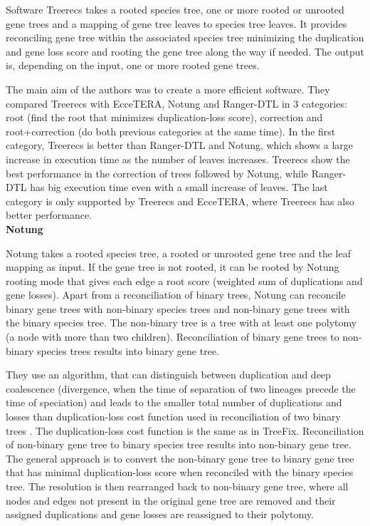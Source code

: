 Software Treerecs \cite{treerecs_tutorial} takes a rooted species tree, one or more rooted or unrooted gene trees and a mapping of gene tree leaves to species tree leaves. It provides reconciling gene tree within the associated species tree minimizing the duplication and gene loss score and rooting the gene tree along the way if needed. The output is, depending on the input, one or more rooted gene trees.

The main aim of the authors was to create a more efficient software. They compared Treerecs with EcceTERA, Notung and Ranger-DTL in 3 categories: root (find the root that minimizes duplication-loss score), correction and root+correction (do both previous categories at the same time). In the first category, Treerecs is better than Ranger-DTL and Notung, which shows a large increase in execution time as the number of leaves increases. Treerecs show the best performance in the correction of trees followed by Notung, while Ranger-DTL has big execution time even with a small increase of leaves. The last category is only supported by Treerecs and EcceTERA, where Treerecs has also better performance.\\
\textbf{Notung}  

Notung \cite{notung} takes a rooted species tree, a rooted or unrooted gene tree and the leaf mapping as input. If the gene tree is not rooted, it can be rooted by Notung rooting mode that gives each edge a root score (weighted sum of duplications and gene losses). Apart from a reconciliation of binary trees, Notung can reconcile binary gene trees with non-binary species trees and non-binary gene trees with the binary species tree. The non-binary tree is a tree with at least one polytomy (a node with more than two children). Reconciliation of binary gene trees to non-binary species trees results into binary gene tree.

They use an algorithm, that can distinguish between duplication and deep coalescence (divergence, when the time of separation of two lineages precede the time of speciation) and leads to the smaller total number of duplications and losses than duplication-loss cost function used in reconciliation of two binary trees \cite{vernot}. The duplication-loss cost function is the same as in TreeFix. Reconciliation of non-binary gene tree to binary species tree results into non-binary gene tree. The general approach is to convert the non-binary gene tree to binary gene tree that has minimal duplication-loss score when reconciled with the binary species tree. The resolution is then rearranged back to non-binary gene tree, where all nodes and edges not present in the original gene tree are removed and their assigned duplications and gene losses are reassigned to their polytomy.

